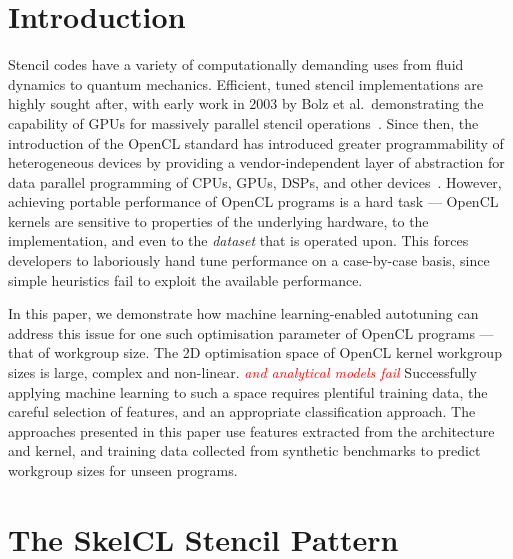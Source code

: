\documentclass[preprint,nonatbib,10pt,nocopyrightspace]{sigplanconf}
\newcommand{\fix}[1]{\textcolor{red}{\em\footnotesize#1}}
\begin{document}



\section{Introduction}\label{sec:introduction}

Stencil codes have a variety of computationally demanding uses from
fluid dynamics to quantum mechanics. Efficient, tuned stencil
implementations are highly sought after, with early work in 2003 by
Bolz et al.\ demonstrating the capability of GPUs for massively
parallel stencil operations~\cite{Bolz2003}. Since then, the
introduction of the OpenCL standard has introduced greater
programmability of heterogeneous devices by providing a
vendor-independent layer of abstraction for data parallel programming
of CPUs, GPUs, DSPs, and other devices~\cite{Stone2010}. However,
achieving portable performance of OpenCL programs is a hard task ---
OpenCL kernels are sensitive to properties of the underlying hardware,
to the implementation, and even to the \emph{dataset} that is operated
upon. This forces developers to laboriously hand tune performance on a
case-by-case basis, since simple heuristics fail to exploit the
available performance.

In this paper, we demonstrate how machine learning-enabled autotuning
can address this issue for one such optimisation parameter of OpenCL
programs --- that of workgroup size. The 2D optimisation space of
OpenCL kernel workgroup sizes is large, complex and
non-linear. \fix{and analytical models fail} Successfully applying
machine learning to such a space requires plentiful training data, the
careful selection of features, and an appropriate classification
approach. The approaches presented in this paper use features
extracted from the architecture and kernel, and training data
collected from synthetic benchmarks to predict workgroup sizes for
unseen programs.


\section{The SkelCL Stencil Pattern}
\end{document}
